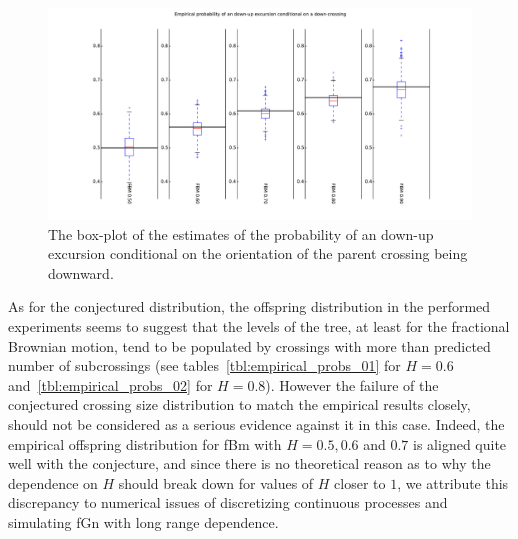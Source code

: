 \documentclass[a4paper]{article}
\begin{document}
\begin{figure}[htb]\begin{center}
    \includegraphics[width=6in]{images/fbm_fig_03_down-up_med_1000-21}
    \caption{The box-plot of the estimates of the probability of an down-up excursion
    conditional on the orientation of the parent crossing being downward.}
\label{fig:fbm_offspring_down_up}
\end{center}\end{figure}

As for the conjectured distribution, the offspring distribution in the performed
experiments seems to suggest that the levels of the tree, at least for the fractional
Brownian motion, tend to be populated by crossings with more than predicted number
of subcrossings (see tables~\ref{tbl:empirical_probs_01} for $H=0.6$
and~\ref{tbl:empirical_probs_02} for $H=0.8$). However the failure of the conjectured
crossing size distribution to match the empirical results closely, should not be
considered as a serious evidence against it in this case. Indeed, the empirical
offspring distribution for fBm with $H=0.5,0.6$ and $0.7$ is aligned quite well
with the conjecture, and since there is no theoretical reason as to why the
dependence on $H$ should break down for values of $H$ closer to $1$, we attribute
this discrepancy to numerical issues of discretizing continuous processes and
simulating fGn with long range dependence. 
\end{document}
